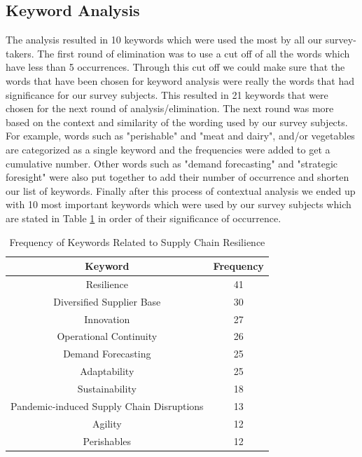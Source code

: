 \subsection{Keyword Analysis}
The analysis resulted in 10 keywords which were used the most by all our survey-takers. The first round of elimination was to use a cut off of all the words which have less than 5 occurrences. Through this cut off we could make sure that the words that have been chosen for keyword analysis were really the words that had significance for our survey subjects. This resulted in 21 keywords that were chosen for the next round of analysis/elimination. The next round was more based on the context and similarity of the wording used by our survey subjects. For example, words such as "perishable" and "meat and dairy", and/or vegetables are categorized as a single keyword and the frequencies were added to get a cumulative number. Other words such as "demand forecasting" and "strategic foresight" were also put together to add their number of occurrence and shorten our list of keywords. Finally after this process of contextual analysis we ended up with 10 most important keywords which were used by our survey subjects which are stated in Table \ref{tab:keyword-frequency} in order of their significance of occurrence.

\bigskip
\begin{table}[h!]
\centering
\begin{tabular}{|c|c|}
\toprule
\textbf{Keyword} & \textbf{Frequency} \\ 
\midrule
Resilience & 41 \\ 
\hline
Diversified Supplier Base & 30 \\
\hline
Innovation & 27 \\
\hline
Operational Continuity & 26 \\
\hline
Demand Forecasting & 25 \\ 
\hline
Adaptability & 25 \\ 
\hline
Sustainability & 18 \\ 
\hline
Pandemic-induced Supply Chain Disruptions & 13 \\ 
\hline
Agility & 12 \\ 
\hline
Perishables & 12 \\ 
\bottomrule
\end{tabular}
\caption{Frequency of Keywords Related to Supply Chain Resilience}
\label{tab:keyword-frequency}
\end{table}
\bigskip



